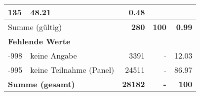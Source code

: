 \begin{longtable}{lXrrr}
       \num{135} &
       \num[round-mode=places,round-precision=2]{48,21} &
         \num[round-mode=places,round-precision=2]{0,48} \\
     \midrule
     \multicolumn{2}{l}{Summe (gültig)} &
       \textbf{\num{280}} &
     \textbf{100} &
       \textbf{\num[round-mode=places,round-precision=2]{0,99}} \\
     \multicolumn{5}{l}{\textbf{Fehlende Werte}}\\
       -998 &
       keine Angabe &
         \num{3391} &
        - &
         \num[round-mode=places,round-precision=2]{12,03} \\
       -995 &
       keine Teilnahme (Panel) &
         \num{24511} &
        - &
         \num[round-mode=places,round-precision=2]{86,97} \\
     \midrule
     \multicolumn{2}{l}{\textbf{Summe (gesamt)}} &
          \textbf{\num{28182}} &
        \textbf{-} &
        \textbf{100} \\
     \bottomrule
     \end{longtable}
     
